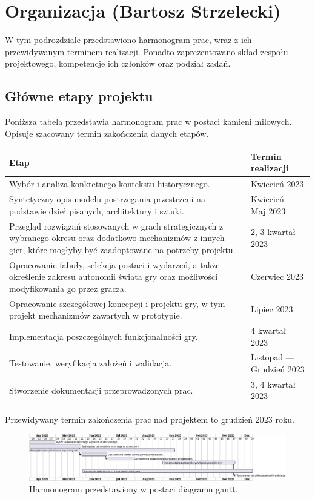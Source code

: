 \section{Organizacja (Bartosz Strzelecki)}\label{s:org}
W tym podrozdziale przedstawiono harmonogram prac, wraz z ich przewidywanym terminem realizacji.
Ponadto zaprezentowano skład zespołu projektowego, kompetencje ich członków oraz podział zadań.
\subsection{Główne etapy projektu}
Poniższa tabela przedstawia harmonogram prac w postaci kamieni milowych. Opisuje szacowany termin zakończenia danych etapów.
\begin{center}
  \begin{tabular}{| m{30em} | m{12em}|} 
  \hline
  Etap & Termin realizacji \\
  \hline\hline
  Wybór i analiza konkretnego kontekstu historycznego. & Kwiecień 2023 \\
  \hline
  Syntetyczny opis modelu postrzegania przestrzeni na podstawie dzieł pisanych, architektury i sztuki. & Kwiecień — Maj 2023 \\
  \hline
  Przegląd rozwiązań stosowanych w grach strategicznych z wybranego okresu oraz dodatkowo mechanizmów z innych gier, które mogłyby być zaadoptowane na potrzeby projektu. & 2, 3 kwartał 2023 \\
  \hline
  Opracowanie fabuły, selekcja postaci i wydarzeń, a także określenie zakresu autonomii świata gry oraz możliwości modyfikowania go przez gracza. & Czerwiec 2023 \\
  \hline
  Opracowanie szczegółowej koncepcji i projektu gry, w tym projekt mechanizmów zawartych w prototypie. & Lipiec 2023 \\
  \hline
  Implementacja poszczególnych funkcjonalności gry. & 4 kwartał 2023 \\ 
  \hline
  Testowanie, weryfikacja założeń i walidacja. & Listopad — Grudzień 2023 \\
  \hline
  Stworzenie dokumentacji przeprowadzonych prac. & 3, 4 kwartał 2023 \\
  \hline
\end{tabular}
\end{center}
Przewidywany termin zakończenia prac nad projektem to grudzień 2023 roku.
\begin{figure}[htbp]
    \centering
    \includegraphics[width=1\textwidth]{uml/Harmonogram}
    \caption{Harmonogram przedstawiony w postaci diagramu gantt.}
\end{figure}
\break
